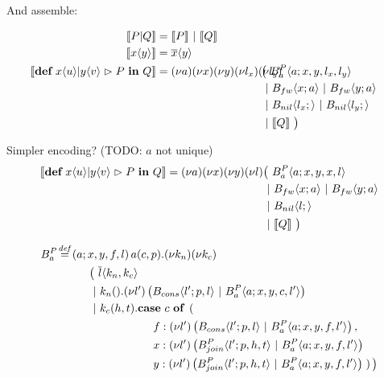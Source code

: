 
And assemble:

\begin{align*}
  \encMJtoAP{P \jpar Q}
  &= \encMJtoAP{P} \apar \encMJtoAP{Q}
  \\
  \encMJtoAP{\jsnd{x}{y}}
  &= \asnd{x}{y}
  \\
  \encMJtoAP{\jdef{\jrct{\jrcv{x}{u} \jpat \jrcv{y}{v}}{P}}{Q}}
  &=
  \anew{a}{\anew{x}{\anew{y}{\anew{l_x}{\anew{l_y}{
    \hspace{-1cm}&&\big(\ \ains{B_a^P}{a}{x, y, l_x, l_y} \\ %
    &&&\apar \ains{B_{fw}}{x}{a} \apar \ains{B_{fw}}{y}{a} \\
    &&&\apar \ains{B_{nil}}{l_x}{} \apar \ains{B_{nil}}{l_y}{} \\
    &&&\apar \encMJtoAP{Q}\ \big)
  }}}}}
\end{align*}


Simpler encoding? (TODO: $a$ not unique)
\begin{align*}
  \encMJtoAP{\jdef{\jrct{\jrcv{x}{u} \jpat \jrcv{y}{v}}{P}}{Q}}
  = \anew{a}{\anew{x}{\anew{y}{\anew{l}{
    &\big(\ \ains{B_a^P}{a}{x, y, x, l} \\
    &\apar \ains{B_{fw}}{x}{a} \apar \ains{B_{fw}}{y}{a} \\
    &\apar \ains{B_{nil}}{l}{} \\
    &\apar \encMJtoAP{Q}
  \ \big)}}}} \\
\end{align*}

\begin{align*}
  \adef*{B_a^P}{a}{x,y,f,l}{\arcv{a}{c,p} . \anew{k_n}{\anew{k_c}{
  \\ & \hspace{1cm}
    \big(\ \asnd{l}{k_n,k_c}
  \\ & \hspace{1cm}
    \apar \arcv{k_n}{} . \anew{l'}{\parens{\ains{B_{cons}}{l'}{p, l} \apar \ains{B_a^P}{a}{x, y, c, l'}}}
  \\ & \hspace{1cm}
    \apar \arcv{k_c}{h,t} . \acse{c}{\right.
  \\ & \hspace{3cm}
    \aalt{f}{\anew{l'}{\parens{\ains{B_{cons}}{l'}{p, l} \apar \ains{B_a^P}{a}{x, y, f, l'}}}},
  \\ & \hspace{3cm}
    \aalt{x}{\anew{l'}{\parens{\ains{B_{join}^P}{l'}{p, h, t} \apar \ains{B_a^P}{a}{x, y, f, l'}}}}
  \\ & \hspace{3cm}
    \aalt{y}{\anew{l'}{\parens{\ains{B_{join}^P}{l'}{p, h, t} \apar \ains{B_a^P}{a}{x, y, f, l'}}}}
    \left.}\big)
  }}} \\
\end{align*}


